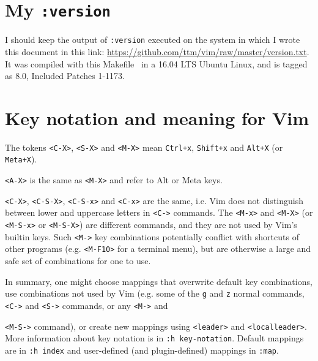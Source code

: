\documentclass{article}
\newcommand{\ttt}[1] {
	\texttt{<#1>}}
\newcommand{\tttt}[1]{\texttt{#1}}
\begin{document}
\section{My \tttt{:version}}
I should keep the output of \tttt{:version} executed on the system
in which I wrote this document in this link:
\url{https://github.com/ttm/vim/raw/master/version.txt}.
It was compiled with this Makefile~\cite{makefile}
in a 16.04 LTS Ubuntu Linux,
and is tagged as 8.0, Included Patches 1-1173.

\section{Key notation and meaning for Vim}\label{sec:not}
The tokens \ttt{C-X}, \ttt{S-X} and \ttt{M-X}
mean \tttt{Ctrl+x}, \tttt{Shift+x} and \tttt{Alt+X}
(or \tttt{Meta+X}).
\ttt{A-X} is the same as \ttt{M-X} and refer to
Alt or Meta keys.
\ttt{C-X}, \ttt{C-S-X}, \ttt{C-S-x} and \ttt{C-x} are the same,
i.e. Vim does not distinguish between lower and uppercase 
letters in \ttt{C-} commands.
The \ttt{M-x} and \ttt{M-X} (or \ttt{M-S-x} or \ttt{M-S-X})
are different commands,
and they are not used by Vim's builtin keys.
Such \ttt{M-} key combinations potentially conflict
with shortcuts of other programs (e.g. \ttt{M-F10} for a terminal menu),
but are otherwise a large and safe set of combinations
for one to use.

In summary,
one might choose mappings that overwrite default key combinations,
use combinations not used by Vim (e.g. some of the \tttt{g} and \tttt{z}
normal commands, \ttt{C-} and \ttt{S-} commands, or any \ttt{M-} and
\ttt{M-S-} command), or
create new mappings using \tttt{<leader>} and \tttt{<localleader>}.
More information about key notation is in \tttt{:h key-notation}.
Default mappings are in \tttt{:h index} and user-defined (and plugin-defined) mappings
in \tttt{:map}.
\end{document}
